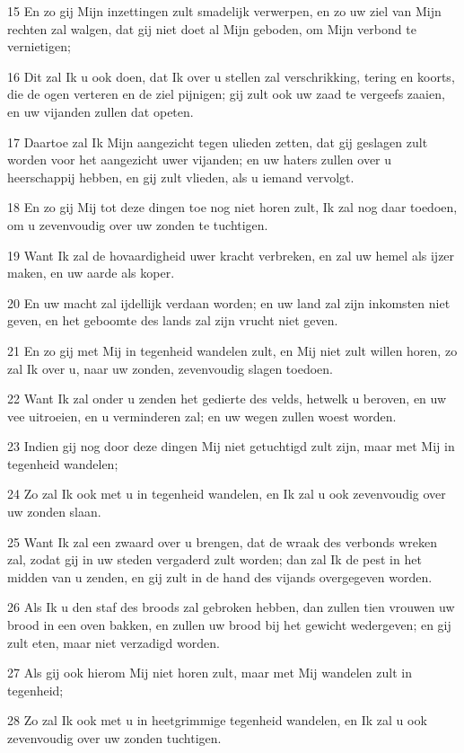 \par 15 En zo gij Mijn inzettingen zult smadelijk verwerpen, en zo uw ziel van Mijn rechten zal walgen, dat gij niet doet al Mijn geboden, om Mijn verbond te vernietigen;
\par 16 Dit zal Ik u ook doen, dat Ik over u stellen zal verschrikking, tering en koorts, die de ogen verteren en de ziel pijnigen; gij zult ook uw zaad te vergeefs zaaien, en uw vijanden zullen dat opeten.
\par 17 Daartoe zal Ik Mijn aangezicht tegen ulieden zetten, dat gij geslagen zult worden voor het aangezicht uwer vijanden; en uw haters zullen over u heerschappij hebben, en gij zult vlieden, als u iemand vervolgt.
\par 18 En zo gij Mij tot deze dingen toe nog niet horen zult, Ik zal nog daar toedoen, om u zevenvoudig over uw zonden te tuchtigen.
\par 19 Want Ik zal de hovaardigheid uwer kracht verbreken, en zal uw hemel als ijzer maken, en uw aarde als koper.
\par 20 En uw macht zal ijdellijk verdaan worden; en uw land zal zijn inkomsten niet geven, en het geboomte des lands zal zijn vrucht niet geven.
\par 21 En zo gij met Mij in tegenheid wandelen zult, en Mij niet zult willen horen, zo zal Ik over u, naar uw zonden, zevenvoudig slagen toedoen.
\par 22 Want Ik zal onder u zenden het gedierte des velds, hetwelk u beroven, en uw vee uitroeien, en u verminderen zal; en uw wegen zullen woest worden.
\par 23 Indien gij nog door deze dingen Mij niet getuchtigd zult zijn, maar met Mij in tegenheid wandelen;
\par 24 Zo zal Ik ook met u in tegenheid wandelen, en Ik zal u ook zevenvoudig over uw zonden slaan.
\par 25 Want Ik zal een zwaard over u brengen, dat de wraak des verbonds wreken zal, zodat gij in uw steden vergaderd zult worden; dan zal Ik de pest in het midden van u zenden, en gij zult in de hand des vijands overgegeven worden.
\par 26 Als Ik u den staf des broods zal gebroken hebben, dan zullen tien vrouwen uw brood in een oven bakken, en zullen uw brood bij het gewicht wedergeven; en gij zult eten, maar niet verzadigd worden.
\par 27 Als gij ook hierom Mij niet horen zult, maar met Mij wandelen zult in tegenheid;
\par 28 Zo zal Ik ook met u in heetgrimmige tegenheid wandelen, en Ik zal u ook zevenvoudig over uw zonden tuchtigen.
